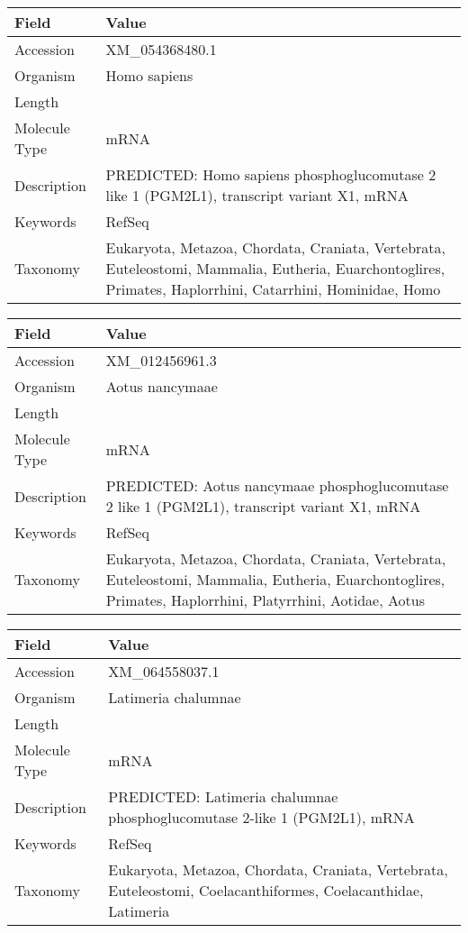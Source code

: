 \documentclass[10pt]{article}
\begin{document}
{\footnotesize
\begin{longtable}{>{\raggedright\arraybackslash}p{4.5cm} >{\raggedright\arraybackslash}p{11.5cm}}
\textbf{Field} & \textbf{Value} \\
\hline
Accession & XM\_054368480.1 \\
Organism & Homo sapiens \\
Length & 8544 \\
Molecule Type & mRNA \\
Description & PREDICTED: Homo sapiens phosphoglucomutase 2 like 1 (PGM2L1), transcript variant X1, mRNA \\
Keywords & RefSeq \\
Taxonomy & Eukaryota, Metazoa, Chordata, Craniata, Vertebrata, Euteleostomi, Mammalia, Eutheria, Euarchontoglires, Primates, Haplorrhini, Catarrhini, Hominidae, Homo \\
\end{longtable}
}

{\footnotesize
\begin{longtable}{>{\raggedright\arraybackslash}p{4.5cm} >{\raggedright\arraybackslash}p{11.5cm}}
\textbf{Field} & \textbf{Value} \\
\hline
Accession & XM\_012456961.3 \\
Organism & Aotus nancymaae \\
Length & 4704 \\
Molecule Type & mRNA \\
Description & PREDICTED: Aotus nancymaae phosphoglucomutase 2 like 1 (PGM2L1), transcript variant X1, mRNA \\
Keywords & RefSeq \\
Taxonomy & Eukaryota, Metazoa, Chordata, Craniata, Vertebrata, Euteleostomi, Mammalia, Eutheria, Euarchontoglires, Primates, Haplorrhini, Platyrrhini, Aotidae, Aotus \\
\end{longtable}
}

{\footnotesize
\begin{longtable}{>{\raggedright\arraybackslash}p{4.5cm} >{\raggedright\arraybackslash}p{11.5cm}}
\textbf{Field} & \textbf{Value} \\
\hline
Accession & XM\_064558037.1 \\
Organism & Latimeria chalumnae \\
Length & 2649 \\
Molecule Type & mRNA \\
Description & PREDICTED: Latimeria chalumnae phosphoglucomutase 2-like 1 (PGM2L1), mRNA \\
Keywords & RefSeq \\
Taxonomy & Eukaryota, Metazoa, Chordata, Craniata, Vertebrata, Euteleostomi, Coelacanthiformes, Coelacanthidae, Latimeria \\
\end{longtable}
}
\end{document}
